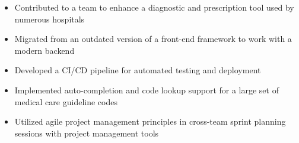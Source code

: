 \begin{itemize}
    \item Contributed to a team to enhance a diagnostic and prescription tool used by numerous hospitals
    \item Migrated from an outdated version of a front-end framework to work with a modern backend
    \item Developed a CI/CD pipeline for automated testing and deployment
    \item Implemented auto-completion and code lookup support for a large set of medical care guideline codes
    \item Utilized agile project management principles in cross-team sprint planning sessions with project management tools
\end{itemize}